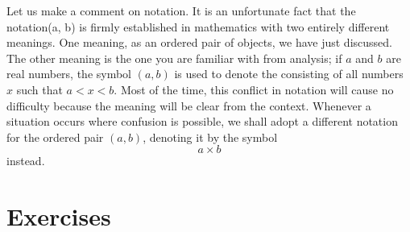 Let us make a comment on notation. It is an unfortunate fact that the notation(a, b) 
is firmly established in mathematics with two entirely different meanings. 
One meaning, as an ordered pair of objects, we have just discussed. 
The other meaning is the one you are familiar with from analysis; 
if \(a\) and \(b\) are real numbers, the symbol \((a, b)\) is used to denote 
the  consisting of all numbers \(x\) such that \(a < x < b\). 
Most of the time, this conflict in notation will cause no difficulty because 
the meaning will be clear from the context. Whenever a situation occurs 
where confusion is possible, we shall adopt a different notation for the ordered pair \((a, b)\), 
denoting it by the symbol
\[
a \times b
\]
instead.

\section*{Exercises}
